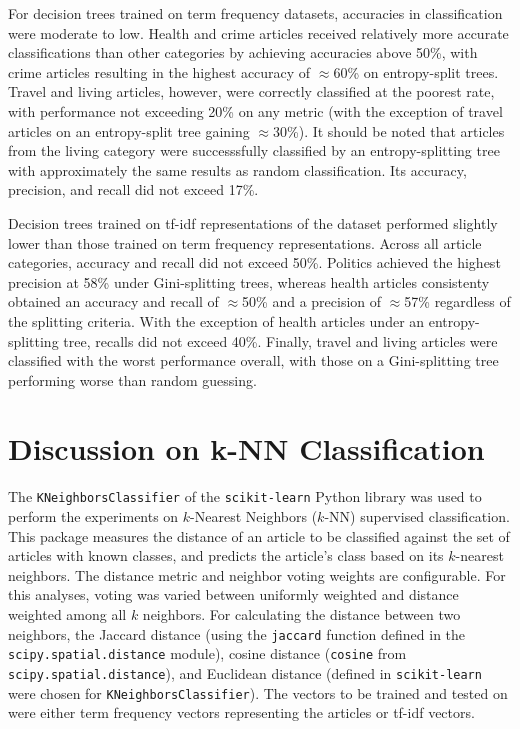 \documentclass[11pt]{article}
\begin{document}
For decision trees trained on term frequency datasets, accuracies in classification were moderate to low.
Health and crime articles received relatively more accurate classifications than other categories by achieving accuracies above 50\%, with crime articles resulting in the highest accuracy of $\approx$60\% on entropy-split trees.
Travel and living articles, however, were correctly classified at the poorest rate, with performance not exceeding 20\% on any metric (with the exception of travel articles on an entropy-split tree gaining $\approx$30\%).
It should be noted that articles from the living category were successsfully classified by an entropy-splitting tree with approximately the same results as random classification.
Its accuracy, precision, and recall did not exceed 17\%.

Decision trees trained on tf-idf representations of the dataset performed slightly lower than those trained on term frequency representations.
Across all article categories, accuracy and recall did not exceed 50\%.
Politics achieved the highest precision at 58\% under Gini-splitting trees, whereas health articles consistenty obtained an accuracy and recall of $\approx$50\% and a precision of $\approx$57\% regardless of the splitting criteria.
With the exception of health articles under an entropy-splitting tree, recalls did not exceed 40\%.
Finally, travel and living articles were classified with the worst performance overall, with those on a Gini-splitting tree performing worse than random guessing.


\section{Discussion on k-NN Classification} \label{sec:knn}

The \texttt{KNeighborsClassifier} of the \texttt{scikit-learn} Python library was used to perform the experiments on $k$-Nearest Neighbors ($k$-NN) supervised classification.
This package measures the distance of an article to be classified against the set of articles with known classes, and predicts the article's class based on its $k$-nearest neighbors.
The distance metric and neighbor voting weights are configurable.
For this analyses, voting was varied between uniformly weighted and distance weighted among all $k$ neighbors.
For calculating the distance between two neighbors, the Jaccard distance (using the \texttt{jaccard} function defined in the \texttt{scipy.spatial.distance} module), cosine distance (\texttt{cosine} from \texttt{scipy.spatial.distance}), and Euclidean distance (defined in \texttt{scikit-learn} were chosen for \texttt{KNeighborsClassifier}).
The vectors to be trained and tested on were either term frequency vectors representing the articles or tf-idf vectors.
\end{document}
